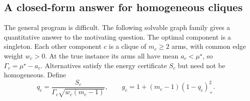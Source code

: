 \documentclass[11pt]{article}
\newcommand{\pos}[1]{\left(#1\right)_+}
\begin{document}


\subsection{A closed-form answer for homogeneous cliques}
The general program is difficult. The following solvable graph family gives a quantitative answer to the motivating question. The optimal component is a singleton. Each other component $c$ is a clique of $m_c\ge2$ arms, with common edge weight $w_c>0$. At the true instance its arms all have mean $a_c<\mu^\star$, so $\Gamma_c=\mu^\star-a_c$. Alternatives satisfy the energy certificate $S_c$ but need not be homogeneous. Define
\begin{equation}
 q_c=\frac{S_c}{\Gamma_c\sqrt{w_c(m_c-1)}},\qquad
 g_c=1+(m_c-1)\pos{1-q_c}^2.
 \label{eq:alignmentratio}
\end{equation}
\end{document}
